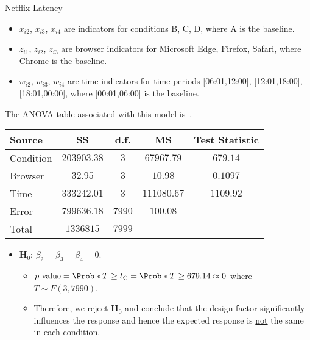 \begin{Example}{Netflix Latency}{}
\begin{itemize}
        \item $ x_{i2} $, $ x_{i3} $, $ x_{i4} $ are indicators for conditions B, C, D, where A is the baseline.
        \item $ z_{i1} $, $ z_{i2} $, $ z_{i3} $ are browser indicators for Microsoft Edge, Firefox, Safari, where Chrome is the baseline.
        \item $ w_{i2} $, $ w_{i3} $, $ w_{i4} $ are time indicators for time periods [06:01,12:00], [12:01,18:00], [18:01,00:00], where [00:01,06:00] is the baseline.
    \end{itemize}
    The ANOVA table associated with this model is~.
    \begin{center}
        \captionsetup{type=table}\label{netflixex2}
        \begin{NiceTabular}{|l|c|c|c|c|}
            \toprule
            Source    & SS                     & d.f.        & MS                                                                   & Test Statistic                                           \\
            \midrule
            Condition & $ 203903.38 $ & $ 3 $     & $ 67967.79 $     & $ 679.14 $ \\
            Browser     & $ 32.95 $ & $ 3 $     & $ 10.98 $     & $ 0.1097 $ \\
            Time     & $ 333242.01 $ & $ 3 $     & $ 111080.67 $     & $ 1109.92 $ \\
            Error     & $ 799636.18 $ & $ 7990 $ & $ 100.08 $ &                                                      \\
            \midrule
            Total     & $ 1336815 $ & $ 7999 $\\
            \bottomrule
        \end{NiceTabular}
    \end{center}
    \begin{itemize}
        \item $ \mathbf{H}_0 $: $ \beta_2=\beta_3=\beta_4=0 $.
              \begin{itemize}
                  \item $ p\text{-value}=\Prob*{T\ge t_\text{C}}=\Prob*{T\ge 679.14}\approx 0 $ where $ T \sim F(3,7990) $.
                  \item Therefore, we reject $ \mathbf{H}_0 $ and conclude that the design factor significantly influences the response
                        and hence the expected response is \underline{not} the same in each condition.

\end{itemize}
\end{itemize}
\end{Example}

